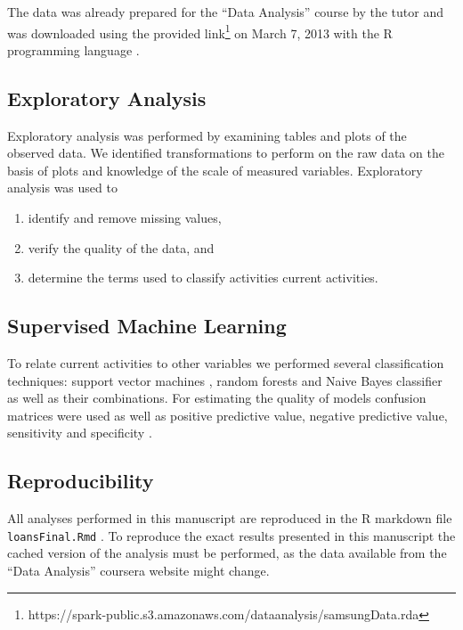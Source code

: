 \documentclass[a4paper,12pt]{extarticle}
\begin{document}
The data was already prepared for the ``Data Analysis'' course by the tutor and was downloaded using the provided link\footnote{https://spark-public.s3.amazonaws.com/dataanalysis/samsungData.rda} on March 7, 2013 with the R programming language \cite{source:r-language}.


\subsection{Exploratory Analysis}

Exploratory analysis was performed by examining tables and plots of the observed data. We identified transformations to perform on the raw data on the basis of plots and knowledge of the scale of measured variables. Exploratory analysis was used to

\begin{enumerate}
  \item identify and remove missing values,
  \item verify the quality of the data, and
  \item determine the terms used to classify activities current activities.
\end{enumerate}

\subsection{Supervised Machine Learning}

To relate current activities to other variables we performed several classification techniques: support vector machines \cite{sourse:dminr.svm}, random forests \cite{sourse:rblogger.classification} and Naive Bayes classifier \cite{sourse:dminr.naivebayes} as well as their combinations. For estimating the quality of models confusion matrices were used as well as positive predictive value, negative predictive value, sensitivity and specificity \cite{source:wiki.estimates}.


\subsection{Reproducibility}

All analyses performed in this manuscript are reproduced in the R markdown file \texttt{loansFinal.Rmd} \cite{source:r-markdown}. To reproduce the exact results presented in this manuscript the cached version of the analysis must be performed, as the data available from the ``Data Analysis'' coursera website might change.
\end{document}
